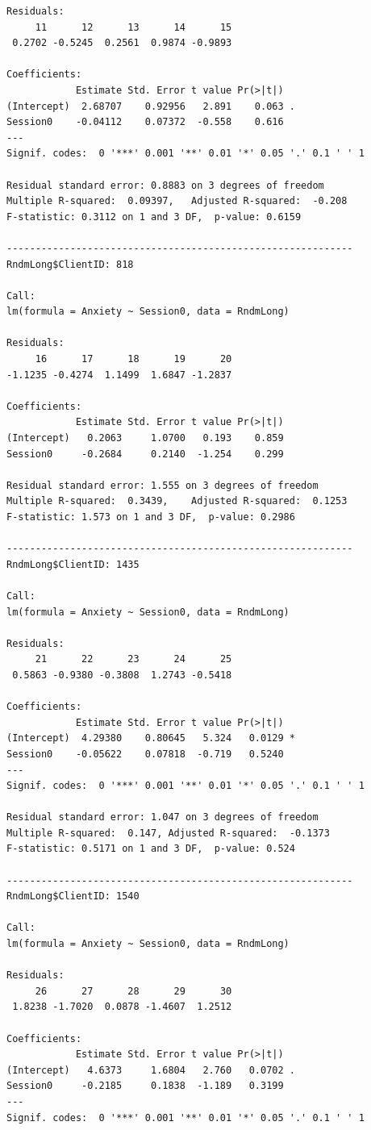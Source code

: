 \documentclass[
  english,
]{book}
\begin{document}
\begin{verbatim}
Residuals:
     11      12      13      14      15 
 0.2702 -0.5245  0.2561  0.9874 -0.9893 

Coefficients:
            Estimate Std. Error t value Pr(>|t|)  
(Intercept)  2.68707    0.92956   2.891    0.063 .
Session0    -0.04112    0.07372  -0.558    0.616  
---
Signif. codes:  0 '***' 0.001 '**' 0.01 '*' 0.05 '.' 0.1 ' ' 1

Residual standard error: 0.8883 on 3 degrees of freedom
Multiple R-squared:  0.09397,   Adjusted R-squared:  -0.208 
F-statistic: 0.3112 on 1 and 3 DF,  p-value: 0.6159

------------------------------------------------------------ 
RndmLong$ClientID: 818

Call:
lm(formula = Anxiety ~ Session0, data = RndmLong)

Residuals:
     16      17      18      19      20 
-1.1235 -0.4274  1.1499  1.6847 -1.2837 

Coefficients:
            Estimate Std. Error t value Pr(>|t|)
(Intercept)   0.2063     1.0700   0.193    0.859
Session0     -0.2684     0.2140  -1.254    0.299

Residual standard error: 1.555 on 3 degrees of freedom
Multiple R-squared:  0.3439,    Adjusted R-squared:  0.1253 
F-statistic: 1.573 on 1 and 3 DF,  p-value: 0.2986

------------------------------------------------------------ 
RndmLong$ClientID: 1435

Call:
lm(formula = Anxiety ~ Session0, data = RndmLong)

Residuals:
     21      22      23      24      25 
 0.5863 -0.9380 -0.3808  1.2743 -0.5418 

Coefficients:
            Estimate Std. Error t value Pr(>|t|)  
(Intercept)  4.29380    0.80645   5.324   0.0129 *
Session0    -0.05622    0.07818  -0.719   0.5240  
---
Signif. codes:  0 '***' 0.001 '**' 0.01 '*' 0.05 '.' 0.1 ' ' 1

Residual standard error: 1.047 on 3 degrees of freedom
Multiple R-squared:  0.147, Adjusted R-squared:  -0.1373 
F-statistic: 0.5171 on 1 and 3 DF,  p-value: 0.524

------------------------------------------------------------ 
RndmLong$ClientID: 1540

Call:
lm(formula = Anxiety ~ Session0, data = RndmLong)

Residuals:
     26      27      28      29      30 
 1.8238 -1.7020  0.0878 -1.4607  1.2512 

Coefficients:
            Estimate Std. Error t value Pr(>|t|)  
(Intercept)   4.6373     1.6804   2.760   0.0702 .
Session0     -0.2185     0.1838  -1.189   0.3199  
---
Signif. codes:  0 '***' 0.001 '**' 0.01 '*' 0.05 '.' 0.1 ' ' 1


\end{verbatim}
\end{document}
